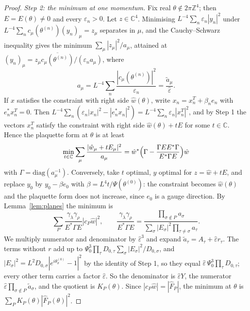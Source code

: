\documentclass[11pt]{amsart}
\theoremstyle{definition}
\theoremstyle{remark}
\numberwithin{equation}{section}
\newcommand{\Z}{\mathbb{Z}}
\newcommand{\C}{\mathbb{C}}
\begin{document}
\begin{proof}
\emph{Step 2: the minimum at one momentum.} Fix real $\theta\notin2\pi
\Z^4$; then $E=E(\theta)\ne0$ and every $\varepsilon_n>0$. Let $z\in\C^4$.
Minimising $L^{-4}\sum_n\varepsilon_n|y_n|^2$ under $L^{-4}\sum_nc_\mu(
\theta^{(n)})(y_n)_\mu=z_\mu$ separates in $\mu$, and the Cauchy--Schwarz
inequality gives the minimum $\sum_\mu|z_\mu|^2/a_\mu$, attained at
$(y_n)_\mu=z_\mu\overline{c_\mu(\theta^{(n)})}/(\varepsilon_na_\mu)$,
where
\[
a_\mu=L^{-4}\sum_n\frac{|c_\mu(\theta^{(n)})|^2}{\varepsilon_n}
=\frac{\tilde a_\mu}{\hat\varepsilon}.
\]
If $x$ satisfies the constraint with right side $\hat w(\theta)$, write $x_n=
x_n^T+\beta_ne_n$ with $e_n^*x_n^T=0$. Then $L^{-4}\sum_n(\varepsilon_n
|x_n|^2-|e_n^*x_n|^2)=L^{-4}\sum_n\varepsilon_n|x^T_n|^2$, and by Step 1 the
vectors $x^T_n$ satisfy the constraint with right side $\hat w(\theta)+tE$
for some $t\in\C$. Hence the plaquette form at $\theta$ is at least
\[
\min_{t\in\C}\sum_\mu\frac{|\hat w_\mu+tE_\mu|^2}{a_\mu}
=\hat w^*\Bigl(\Gamma-\frac{\Gamma EE^*\Gamma}{E^*\Gamma E}\Bigr)\hat w
\]
with $\Gamma=\mathrm{diag}(a_\mu^{-1})$. Conversely, take $t$ optimal, $y$ optimal for $z=\hat w+tE$, and replace
$y_0$ by $y_0-\beta e_0$ with $\beta=L^4t/\Psi(\theta^{(0)})$: the constraint
becomes $\hat w(\theta)$ and the plaquette form does not increase, since
$e_0$ is a gauge direction. By Lemma~\ref{lem:planes} the minimum is
\[
\sum_P\frac{\gamma_\lambda\gamma_\rho}{E^*\Gamma E}|c_P\hat w|^2,\qquad
\frac{\gamma_\lambda\gamma_\rho}{E^*\Gamma E}=\frac{\prod_{\sigma\notin P}
a_\sigma}{\sum_\sigma|E_\sigma|^2\prod_{\tau\ne\sigma}a_\tau}.
\]
We multiply numerator and denominator by $\hat\varepsilon^3$ and expand
$\tilde a_\tau=A_\tau+\hat\varepsilon r_\tau$. The terms without $r$ add up
to $\Psi_0^3\prod_\tau D_{0,\tau}\sum_\sigma|E_\sigma|^2/D_{0,\sigma}$,
and $|E_\sigma|^2=L^2D_{0,\sigma}|e^{i\theta^{(0)}_\sigma}-1|^2$ by the
identity of Step 1, so they equal $\hat\varepsilon\,\Psi_0^3\prod_\tau
D_{0,\tau}$; every other term carries a factor $\hat\varepsilon$. So the
denominator is $\hat\varepsilon Y$, the numerator $\hat\varepsilon\prod_{
\sigma\notin P}\tilde a_\sigma$, and the quotient is $K_P(\theta)$. Since
$|c_P\hat w|=|\hat F_P|$, the minimum at $\theta$ is $\sum_PK_P(\theta)|\hat F_P(
\theta)|^2$.


\end{proof}
\end{document}

